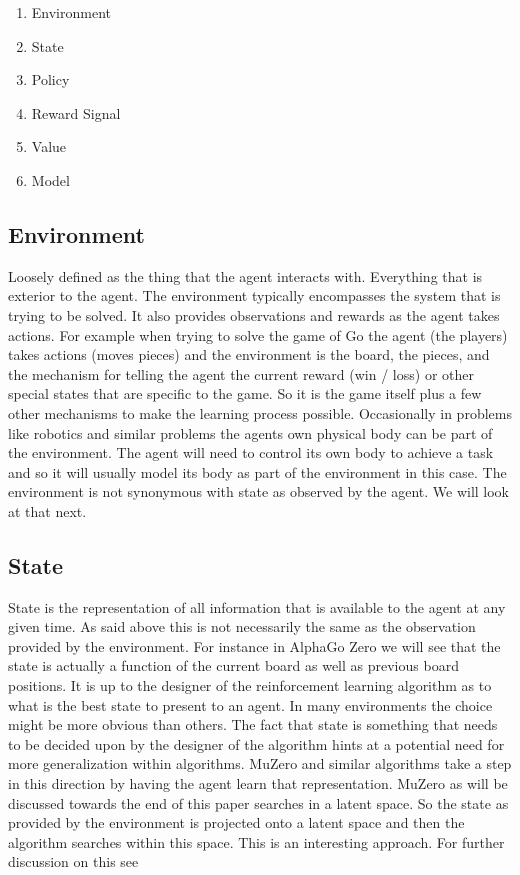     
    \begin{enumerate}
        \item Environment
        \item State
        \item Policy
        \item Reward Signal 
        \item Value
        \item Model
    \end{enumerate}
    
    \subsection{Environment}
    
    Loosely defined as the thing that the agent interacts with. Everything that is exterior to the agent. The environment typically encompasses the system that is trying to be solved. It also provides observations and rewards as the agent takes actions. For example when trying to solve the game of Go the agent (the players) takes actions (moves pieces) and the environment is the board, the pieces, and the mechanism for telling the agent the current reward (win / loss) or other special states that are specific to the game. So it is the game itself plus a few other mechanisms to make the learning process possible. Occasionally in problems like robotics and similar problems the agents own physical body can be part of the environment. The agent will need to control its own body to achieve a task and so it will usually model its body as part of the environment in this case. The environment is not synonymous with state as observed by the agent. We will look at that next. 
    
    \subsection{State}
    
    State is the representation of all information that is available to the agent at any given time. As said above this is not necessarily the same as the observation provided by the environment. For instance in AlphaGo Zero we will see that the state is actually a function of the current board as well as previous board positions. It is up to the designer of the reinforcement learning algorithm as to what is the best state to present to an agent. In many environments the choice might be more obvious than others. 
    The fact that state is something that needs to be decided upon by the designer of the algorithm hints at a potential need for more generalization within algorithms. MuZero and similar algorithms take a step in this direction by having the agent learn that representation. MuZero as will be discussed towards the end of this paper searches in a latent space. So the state as provided by the environment is projected onto a latent space and then the algorithm searches within this space. This is an interesting approach. For further discussion on this see \cite{predictron,muzero}
    
